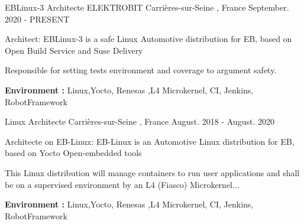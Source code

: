 


\begin{cventries}


\cventry
{EBLinux-3 Architecte} %
{ELEKTROBIT} %
{Carrières-sur-Seine , France} %
{September. 2020 - PRESENT} %
{ %
\begin{cvitems}
\item {Architect: EBLinux-3 is a safe Linux Automotive distribution for EB, based on Open Build Service and Suse Delivery}
\item {Responsible for setting tests environment and coverage to argument safety.}
\item { \textbf{Environment :} Linux,Yocto, Renesas ,L4 Microkernel, CI, Jenkins, RobotFramework}
\end{cvitems}
}

\cventry
{Linux Architecte } %
{} %
{Carrières-sur-Seine , France} %
{August. 2018 - August. 2020} %
{ %
\begin{cvitems}
\item {Architecte on EB-Linux: EB-Linux is an Automotive Linux distribution for EB, based on Yocto Open-embedded tools}
\item {This Linux distribution will manage containers to run user applications and shall be on a supervised environment by an L4 (Fiasco) Microkernel...}
\item { \textbf{Environment :} Linux,Yocto, Renesas ,L4 Microkernel, CI, Jenkins, RobotFramework}
\end{cvitems}
}


\end{cventries}
